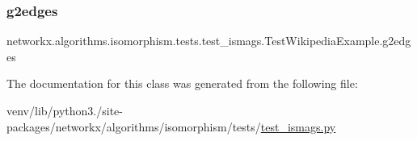 \subsubsection{\texorpdfstring{g2edges}{g2edges}}
{\footnotesize\ttfamily networkx.\+algorithms.\+isomorphism.\+tests.\+test\+\_\+ismags.\+Test\+Wikipedia\+Example.\+g2edges\hspace{0.3cm}{\ttfamily [static]}}



The documentation for this class was generated from the following file\+:\begin{DoxyCompactItemize}
\item 
venv/lib/python3./site-\/packages/networkx/algorithms/isomorphism/tests/\hyperlink{test__ismags_8py}{test\+\_\+ismags.\+py}\end{DoxyCompactItemize}
